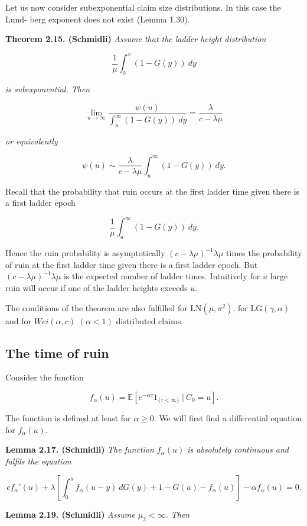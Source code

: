 \documentclass[a4paper,10pt,openany]{book}
\begin{document}
Let us now consider subexponential claim size distributions. In this case the Lund- berg exponent does not exist (Lemma 1.30).

\textbf{Theorem 2.15. (Schmidli)} \emph{Assume that the ladder height distribution}

\[
\frac{1}{\mu}\int_0^x(1-G(y))\ dy
\]

\emph{is subexponential. Then}

\[
\lim_{u\to\infty}\frac{\psi(u)}{\int_u^\infty (1-G(y))\ dy}=\frac{\lambda}{c-\lambda\mu}
\]

\emph{or equivalently}

\[
\psi(u)\sim \frac{\lambda}{c-\lambda\mu}\int_u^\infty (1-G(y))\ dy.
\]

Recall that the probability that ruin occurs at the first ladder time given there is a first ladder epoch

\[
\frac{1}{\mu}\int_u^\infty(1-G(y))\ dy.
\]

Hence the ruin probability is asymptotically \((c − \lambda\mu)^{-1}\lambda\mu\) times the probability of ruin at the first ladder time given there is a first ladder epoch. But \((c − \lambda\mu)^{-1}\lambda\mu\) is the expected number of ladder times. Intuitively for \(u\) large ruin will occur if one of the ladder heights exceeds \(u\).

The conditions of the theorem are also fulfilled for \(\text{LN}(\mu,\sigma^2)\), for \(\text{LG}(\gamma ,\alpha)\) and for \(Wei(\alpha, c)\) \((\alpha < 1)\) distributed claims.

\hypertarget{the-time-of-ruin}{%
\subsection{The time of ruin}\label{the-time-of-ruin}}

Consider the function

\[
f_\alpha(u)=\mathbb E[e^{-\alpha \tau}1_{\{\tau<\infty\}}\ \vert\ C_0=u].
\]

The function is defined at least for \(\alpha\ge 0\). We will first find a differential equation for \(f_\alpha(u)\).

\textbf{Lemma 2.17. (Schmidli)} \emph{The function \(f_\alpha(u)\) is absolutely continuous and fulfils the equation}

\[
cf_\alpha'(u)+\lambda\left[\int_0^u f_\alpha(u-y)\ dG(y) + 1 -G(u)-f_\alpha (u)\right] - \alpha f_\alpha(u)=0.
\]

\textbf{Lemma 2.19. (Schmidli)} \emph{Assume \(\mu_2<\infty\). Then}
\end{document}
